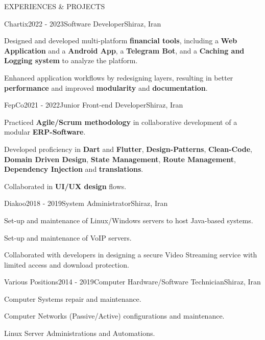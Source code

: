 \documentclass[
	a4paper, %
	12pt, %
]{resume} %
\begin{document}
\begin{rSection}{EXPERIENCES \& PROJECTS}
	\begin{rSubsection}{Chartix}{2022 - 2023}{Software Developer}{Shiraz, Iran}
        \item Designed and developed multi-platform \textbf{financial tools}, including a \textbf{Web Application} and a \textbf{Android App}, a \textbf{Telegram Bot}, and a \textbf{Caching and Logging system} to analyze the platform. 
        \item Enhanced application workflows by redesigning layers, resulting in better \textbf{performance} and improved \textbf{modularity} and \textbf{documentation}.
        \break {}      
	\end{rSubsection}

	\begin{rSubsection}{FepCo}{2021 - 2022}{Junior Front-end Developer}{Shiraz, Iran}
	   	\item Practiced \textbf{Agile/Scrum methodology} in collaborative development of a modular \textbf{ERP-Software}.
        \item Developed proficiency in \textbf{Dart} and \textbf{Flutter}, \textbf{Design-Patterns}, \textbf{Clean-Code},  \textbf{Domain Driven Design}, \textbf{State Management}, \textbf{Route Management}, \textbf{Dependency Injection} and \textbf{translations}.
		\item Collaborated in \textbf{UI/UX design} flows.
        \break {}    
	\end{rSubsection}

	\begin{rSubsection}{Diakoo}{2018 - 2019}{System Administrator}{Shiraz, Iran}
		\item Set-up and maintenance of Linux/Windows servers to host Java-based systems.
        \item Set-up and maintenance of VoIP servers.
        \item Collaborated with developers in designing a secure Video Streaming service with limited access and download protection.
	\end{rSubsection}

    	\begin{rSubsection}{Various Positions}{2014 - 2019}{Computer Hardware/Software Technician}{Shiraz, Iran}
		\item Computer Systems repair and maintenance.
        \item Computer Networks (Passive/Active) configurations and maintenance.
        \item Linux Server Administrations and Automations.
	\end{rSubsection}
\bigskip
\end{rSection}
\end{document}
